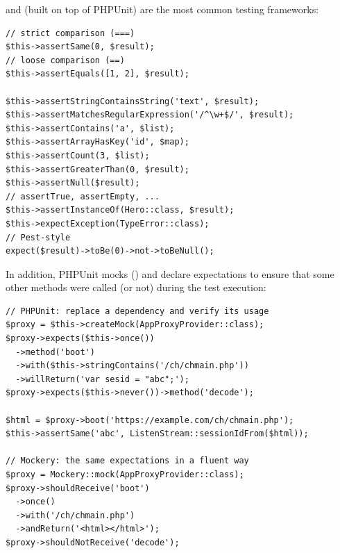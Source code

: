  and  (built on top of PHPUnit) are the most common testing frameworks:

\begin{lstlisting}
// strict comparison (===)
$this->assertSame(0, $result);
// loose comparison (==)
$this->assertEquals([1, 2], $result);

$this->assertStringContainsString('text', $result);
$this->assertMatchesRegularExpression('/^\w+$/', $result);
$this->assertContains('a', $list);
$this->assertArrayHasKey('id', $map);
$this->assertCount(3, $list);
$this->assertGreaterThan(0, $result);
$this->assertNull($result);
// assertTrue, assertEmpty, ...
$this->assertInstanceOf(Hero::class, $result);
$this->expectException(TypeError::class);
// Pest-style
expect($result)->toBe(0)->not->toBeNull();
\end{lstlisting}

\noindent In addition, PHPUnit mocks () and  declare expectations to
ensure that some other methods were called (or not) during the test execution:

\begin{lstlisting}
// PHPUnit: replace a dependency and verify its usage
$proxy = $this->createMock(AppProxyProvider::class);
$proxy->expects($this->once())
  ->method('boot')
  ->with($this->stringContains('/ch/chmain.php'))
  ->willReturn('var sesid = "abc";');
$proxy->expects($this->never())->method('decode');

$html = $proxy->boot('https://example.com/ch/chmain.php');
$this->assertSame('abc', ListenStream::sessionIdFrom($html));

// Mockery: the same expectations in a fluent way
$proxy = Mockery::mock(AppProxyProvider::class);
$proxy->shouldReceive('boot')
  ->once()
  ->with('/ch/chmain.php')
  ->andReturn('<html></html>');
$proxy->shouldNotReceive('decode');
\end{lstlisting}
